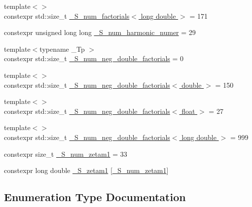 \begin{DoxyCompactItemize}
\item 
{\footnotesize template$<$$>$ }\\constexpr std\+::size\+\_\+t \hyperlink{namespacestd_1_1____detail_ab90b8eb39ff963a5ed533a3be0b7f7fd}{\+\_\+\+S\+\_\+num\+\_\+factorials$<$ long double $>$} = 171
\item 
constexpr unsigned long long \hyperlink{namespacestd_1_1____detail_a554788747841f6abbfd7572673df32ad}{\+\_\+\+S\+\_\+num\+\_\+harmonic\+\_\+numer} = 29
\item 
{\footnotesize template$<$typename \+\_\+\+Tp $>$ }\\constexpr std\+::size\+\_\+t \hyperlink{namespacestd_1_1____detail_ac386f200e589ce1fc895c2aac0e47f8c}{\+\_\+\+S\+\_\+num\+\_\+neg\+\_\+double\+\_\+factorials} = 0
\item 
{\footnotesize template$<$$>$ }\\constexpr std\+::size\+\_\+t \hyperlink{namespacestd_1_1____detail_a2d14a1207a6fea22f32586dfd41cf49d}{\+\_\+\+S\+\_\+num\+\_\+neg\+\_\+double\+\_\+factorials$<$ double $>$} = 150
\item 
{\footnotesize template$<$$>$ }\\constexpr std\+::size\+\_\+t \hyperlink{namespacestd_1_1____detail_a3ce62e66e9a196fd89b4d841f7374d68}{\+\_\+\+S\+\_\+num\+\_\+neg\+\_\+double\+\_\+factorials$<$ float $>$} = 27
\item 
{\footnotesize template$<$$>$ }\\constexpr std\+::size\+\_\+t \hyperlink{namespacestd_1_1____detail_a2ef051ec96e521e71489d2327d11c22a}{\+\_\+\+S\+\_\+num\+\_\+neg\+\_\+double\+\_\+factorials$<$ long double $>$} = 999
\item 
constexpr size\+\_\+t \hyperlink{namespacestd_1_1____detail_a807e36c2aec3a9f27fdb21726cd464e2}{\+\_\+\+S\+\_\+num\+\_\+zetam1} = 33
\item 
constexpr long double \hyperlink{namespacestd_1_1____detail_a22ed80d9e5c3bc79e61a3cdb8e79a462}{\+\_\+\+S\+\_\+zetam1} \mbox{[}\hyperlink{namespacestd_1_1____detail_a807e36c2aec3a9f27fdb21726cd464e2}{\+\_\+\+S\+\_\+num\+\_\+zetam1}\mbox{]}
\end{DoxyCompactItemize}


\subsection{Enumeration Type Documentation}
